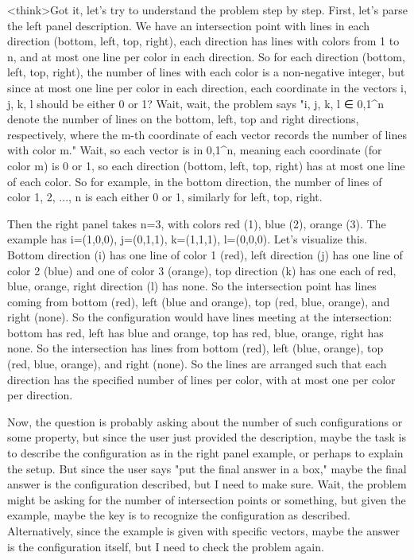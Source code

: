 <think>Got it, let's try to understand the problem step by step. First, let's parse the left panel description. We have an intersection point with lines in each direction (bottom, left, top, right), each direction has lines with colors from 1 to n, and at most one line per color in each direction. So for each direction (bottom, left, top, right), the number of lines with each color is a non-negative integer, but since at most one line per color in each direction, each coordinate in the vectors i, j, k, l should be either 0 or 1? Wait, wait, the problem says "i, j, k, l ∈ {0,1}^n denote the number of lines on the bottom, left, top and right directions, respectively, where the m-th coordinate of each vector records the number of lines with color m." Wait, so each vector is in {0,1}^n, meaning each coordinate (for color m) is 0 or 1, so each direction (bottom, left, top, right) has at most one line of each color. So for example, in the bottom direction, the number of lines of color 1, 2, ..., n is each either 0 or 1, similarly for left, top, right.

Then the right panel takes n=3, with colors red (1), blue (2), orange (3). The example has i=(1,0,0), j=(0,1,1), k=(1,1,1), l=(0,0,0). Let's visualize this. Bottom direction (i) has one line of color 1 (red), left direction (j) has one line of color 2 (blue) and one of color 3 (orange), top direction (k) has one each of red, blue, orange, right direction (l) has none. So the intersection point has lines coming from bottom (red), left (blue and orange), top (red, blue, orange), and right (none). So the configuration would have lines meeting at the intersection: bottom has red, left has blue and orange, top has red, blue, orange, right has none. So the intersection has lines from bottom (red), left (blue, orange), top (red, blue, orange), and right (none). So the lines are arranged such that each direction has the specified number of lines per color, with at most one per color per direction.

Now, the question is probably asking about the number of such configurations or some property, but since the user just provided the description, maybe the task is to describe the configuration as in the right panel example, or perhaps to explain the setup. But since the user says "put the final answer in a box," maybe the final answer is the configuration described, but I need to make sure. Wait, the problem might be asking for the number of intersection points or something, but given the example, maybe the key is to recognize the configuration as described. Alternatively, since the example is given with specific vectors, maybe the answer is the configuration itself, but I need to check the problem again.

